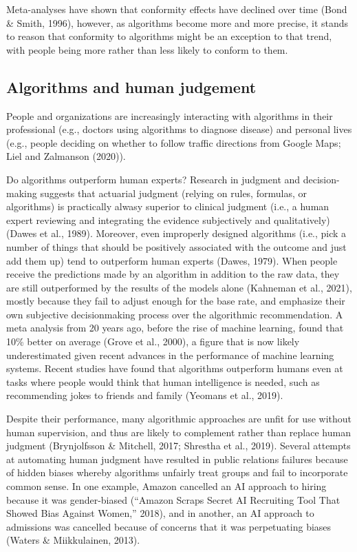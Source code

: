 \documentclass[
  man ,floatsintext]{apa7}
\begin{document}
Meta-analyses have shown that conformity effects have declined over time (Bond \& Smith, 1996), however, as algorithms become more and more precise, it stands to reason that conformity to algorithms might be an exception to that trend, with people being more rather than less likely to conform to them.

\hypertarget{algorithms-and-human-judgement}{%
\subsection{Algorithms and human judgement}\label{algorithms-and-human-judgement}}

People and organizations are increasingly interacting with algorithms in their professional (e.g., doctors using algorithms to diagnose disease) and personal lives (e.g., people deciding on whether to follow traffic directions from Google Maps; Liel and Zalmanson (2020)).

Do algorithms outperform human experts? Research in judgment and decision-making suggests that actuarial judgment (relying on rules, formulas, or algorithms) is practically alwasy superior to clinical judgment (i.e., a human expert reviewing and integrating the evidence subjectively and qualitatively) (Dawes et al., 1989). Moreover, even improperly designed algorithms (i.e., pick a number of things that should be positively associated with the outcome and just add them up) tend to outperform human experts (Dawes, 1979). When people receive the predictions made by an algorithm in addition to the raw data, they are still outperformed by the results of the models alone (Kahneman et al., 2021), mostly because they fail to adjust enough for the base rate, and emphasize their own subjective decisionmaking process over the algorithmic recommendation. A meta analysis from 20 years ago, before the rise of machine learning, found that 10\% better on average (Grove et al., 2000), a figure that is now likely underestimated given recent advances in the performance of machine learning systems. Recent studies have found that algorithms outperform humans even at tasks where people would think that human intelligence is needed, such as recommending jokes to friends and family (Yeomans et al., 2019).

Despite their performance, many algorithmic approaches are unfit for use without human supervision, and thus are likely to complement rather than replace human judgment (Brynjolfsson \& Mitchell, 2017; Shrestha et al., 2019). Several attempts at automating human judgment have resulted in public relations failures because of hidden biases whereby algorithms unfairly treat groups and fail to incorporate common sense. In one example, Amazon cancelled an AI approach to hiring because it was gender-biased ({``Amazon Scraps Secret AI Recruiting Tool That Showed Bias Against Women,''} 2018), and in another, an AI approach to admissions was cancelled because of concerns that it was perpetuating biases (Waters \& Miikkulainen, 2013).
\end{document}

